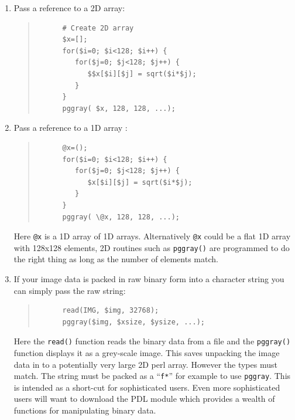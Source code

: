 \documentclass[twoside,11pt]{article}
\begin{document}
\begin{enumerate}
\item Pass a reference to a 2D array: 
   \small
   \begin{quote}
   \begin{verbatim}
      # Create 2D array
      $x=[];
      for($i=0; $i<128; $i++) { 
         for($j=0; $j<128; $j++) {
            $$x[$i][$j] = sqrt($i*$j); 
         }
      }
      pggray( $x, 128, 128, ...);
   \end{verbatim}
   \end{quote}
   \normalsize


\item Pass a reference to a 1D array :
   \small
   \begin{quote}
   \begin{verbatim}
      @x=();
      for($i=0; $i<128; $i++) { 
         for($j=0; $j<128; $j++) {
            $x[$i][$j] = sqrt($i*$j); 
         }
      }
      pggray( \@x, 128, 128, ...);
   \end{verbatim}
   \end{quote}
   \normalsize

Here {\tt @x} is a 1D array of 1D arrays.  Alternatively {\tt @x} could be a flat 1D array with 128x128 elements, 2D routines such as {\tt pggray()} are programmed to do the right thing as long as the number of elements match. 

\item  If your image data is packed in raw binary form into a character string you can simply pass the raw string:

   \small
   \begin{quote}
   \begin{verbatim}
      read(IMG, $img, 32768); 
      pggray($img, $xsize, $ysize, ...);
   \end{verbatim}
   \end{quote}
   \normalsize

   Here the {\tt read()} function reads the binary data from a file and the {\tt pggray()} function displays it as a grey-scale image. This saves unpacking the image data in to a potentially very large 2D perl array. However the types must match. The string must be packed as a ``{\tt f*}'' for example to use {\tt pggray}. This is intended as a short-cut for sophisticated users. Even more sophisticated users will want to download the PDL module which provides a wealth of functions for  manipulating binary data. 

\end{enumerate}
\end{document}

